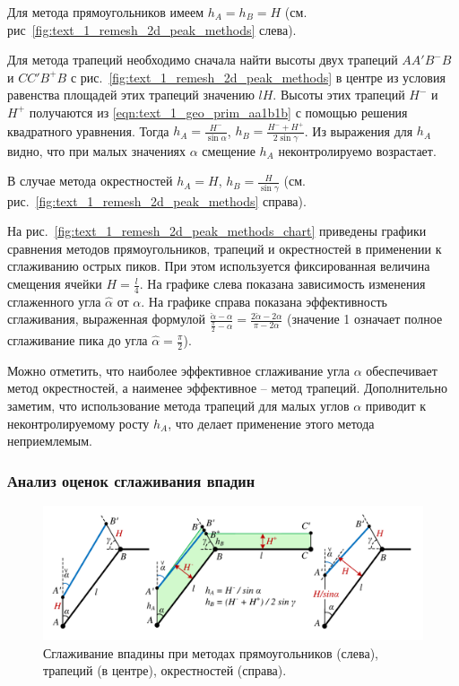 Для метода прямоугольников имеем $h_A = h_B = H$ (см. рис~\ref{fig:text_1_remesh_2d_peak_methods} слева).

Для метода трапеций необходимо сначала найти высоты двух трапеций $AA'B^{-}B$ и $CC'B^{+}B$ с рис.~\ref{fig:text_1_remesh_2d_peak_methods} в центре из условия равенства площадей этих трапеций значению $lH$.
Высоты этих трапеций $H^{-}$ и $H^{+}$ получаются из \eqref{eqn:text_1_geo_prim_aa1b1b} с помощью решения квадратного уравнения.
Тогда $h_A = \frac{H^{-}}{\sin \alpha}$, $h_B = \frac{H^{-} + H^{+}}{2 \sin \gamma}$.
Из выражения для $h_A$ видно, что при малых значениях $\alpha$ смещение $h_A$ неконтролируемо возрастает.

В случае метода окрестностей $h_A = H$,  $h_B = \frac{H}{\sin \gamma}$ (см. рис.~\ref{fig:text_1_remesh_2d_peak_methods} справа).

На рис.~\ref{fig:text_1_remesh_2d_peak_methods_chart} приведены графики сравнения методов прямоугольников, трапеций и окрестностей в применении к сглаживанию острых пиков.
При этом используется фиксированная величина смещения ячейки $H = \frac{l}{4}$.
На графике слева показана зависимость изменения сглаженного угла $\hat{\alpha}$ от $\alpha$.
На графике справа показана эффективность сглаживания, выраженная формулой $\frac{\check{\alpha} - \alpha}{\frac{\pi}{2} - \alpha} = \frac{2 \check{\alpha} - 2 \alpha}{\pi - 2 \alpha}$ (значение 1 означает полное сглаживание пика до угла $\hat{\alpha} = \frac{\pi}{2}$).

Можно отметить, что наиболее эффективное сглаживание угла $\alpha$ обеспечивает метод окрестностей, а наименее эффективное -- метод трапеций.
Дополнительно заметим, что использование метода трапеций для малых углов $\alpha$ приводит к неконтролируемому росту $h_A$, что делает применение этого метода неприемлемым.

\subsubsection{Анализ оценок сглаживания впадин}

\begin{figure}[ht]
\centering
\includegraphics[width=1.0\textwidth]{fig/2dr_cavern_methods.pdf}
\singlespacing
{}\caption{Сглаживание впадины при методах прямоугольников (слева), трапеций (в центре), окрестностей (справа).}
\label{fig:text_1_remesh_2d_cavern_methods}
\end{figure}

